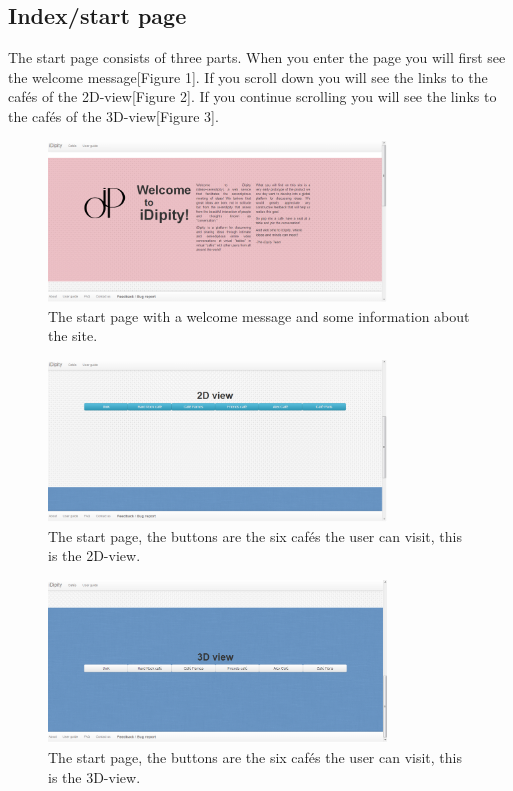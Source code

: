 \documentclass[12pt, titlepage]{article}
\begin{document}
\subsection{Index/start page}
The start page consists of three parts. When you enter the page you will first see the welcome message[Figure 1]. If you scroll down you will see the links to the cafés of the 2D-view[Figure 2]. If you continue scrolling you will see the links to the cafés of the 3D-view[Figure 3].
\begin{figure}[H]
  \centering
	\includegraphics[width=0.8\textwidth,keepaspectratio]{indexpage1.png}
  \caption{The start page with a welcome message and some information about the site.}
\end{figure}
\begin{figure}[H]
  \centering
	\includegraphics[width=0.8\textwidth,keepaspectratio]{indexpage2.png}
  \caption{The start page, the buttons are the six cafés the user can visit, this is the 2D-view.}
\end{figure}
\begin{figure}[H]
  \centering
	\includegraphics[width=0.8\textwidth,keepaspectratio]{indexpage3.png}
  \caption{The start page, the buttons are the six cafés the user can visit, this is the 3D-view.}
\end{figure}
\end{document}
